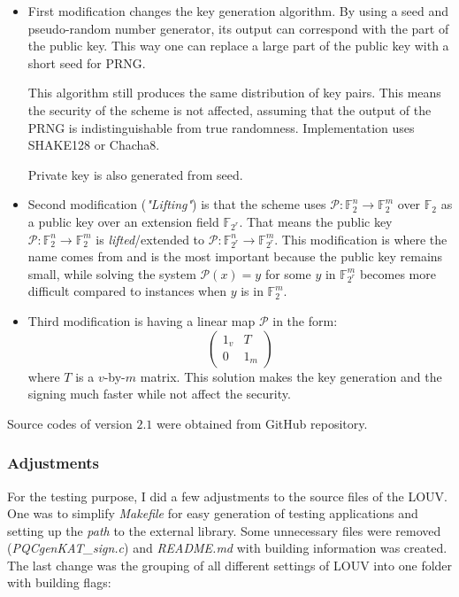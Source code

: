 \documentclass[thesis=M,english]{FITthesis}[2019/12/23]
\begin{document}
\begin{itemize}
\item	First modification changes the key generation algorithm. By using a seed and pseudo-random number generator, its output can correspond with the part of the public key. This way one can replace a large part of the public key with a short seed for PRNG.

This algorithm still produces the same distribution of key pairs. This means the security of the scheme is not affected, assuming that the output of the PRNG is indistinguishable from true randomness. Implementation uses SHAKE128 or Chacha8.

Private key is also generated from seed.

\item	Second modification (\textit{"Lifting"}) is that the scheme uses $\mathcal{P}:\mathbb{F}_2^n \rightarrow \mathbb{F}_2^m$ over $\mathbb{F}_2$ as a public key over an extension field $\mathbb{F}_{2^r}$. That means the public key $\mathcal{P}:\mathbb{F}_2^n \rightarrow \mathbb{F}_2^m$ is \textit{lifted}/extended to $\mathcal{P}:\mathbb{F}_{2^r}^n \rightarrow \mathbb{F}_{2^r}^m$. This modification is where the name comes from and is the most important because the public key remains small, while solving the system $\mathcal{P}(x) = y$ for some $y$ in $\mathbb{F}_{2^r}^m$ becomes more difficult compared to instances when $y$ is in $\mathbb{F}_{2}^m$.\cite{L-LIFTING}

\item	Third modification is having a linear map $\mathcal{P}$ in the form:
\begin{equation*}
\begin{pmatrix}
1_v & T\\
0 & 1_m
\end{pmatrix}
\end{equation*}
where $T$ is a $v$-by-$m$ matrix. This solution makes the key generation and the signing much faster\cite{L-CZYP} while not affect the security.\cite{L-EQ-KEYS}
\end{itemize}

Source codes of version $2.1$ were obtained from GitHub repository.

\subsubsection{Adjustments}
For the testing purpose, I did a few adjustments to the source files of the LOUV. One was to simplify \textit{Makefile} for easy generation of testing applications and setting up the \textit{path} to the external library. Some unnecessary files were removed (\textit{PQCgenKAT\_sign.c}) and \textit{README.md} with building information was created. The last change was the grouping of all different settings of LOUV into one folder with building flags:
\end{document}
